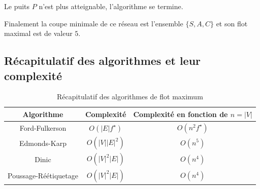 \documentclass[a4paper]{article}
\begin{document}
	\begin{center}
	\end{center}
Le puits $P$ n'est plus atteignable, l'algorithme se termine.

Finalement la coupe minimale de ce réseau est l'ensemble $\{S,A,C\}$ et son flot maximal est de valeur $5$.
\subsection{Récapitulatif des algorithmes et leur complexité}
\begin{table}[H]
	\centering
	\begin{tabular}{|c|c|c|}
		\hline
		Algorithme & Complexité & Complexité en fonction de $n = |V|$ \\
		\hline
		Ford-Fulkerson & $O(|E|f^\star)$ &$O(n^2 f^\star)$\\
		Edmonds-Karp & $O(|V||E|^2)$ &$O(n^5)$\\
		Dinic & $O(|V|^2|E|)$& $O(n^4)$\\
		Poussage-Réétiquetage & $O(|V|^2|E|)$&$O(n^4)$ \\
		\hline
	\end{tabular}
	\caption{Récapitulatif des algorithmes de flot maximum}
\end{table}

\end{document}
